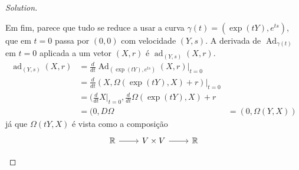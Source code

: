 \begin{proof}[Solution]
\begin{enumerate}[label=\alph*.]
Em fim, parece que tudo se reduce a usar a curva $\gamma(t)=(\operatorname{exp}(tY),e^{ts})$, que em $t=0$ passa por $(0,0)$ com velocidade $(Y,s)$. A derivada de $\operatorname{Ad}_{\gamma(t)}$ em $t=0$ aplicada a um vetor $(X,r)$  é $\operatorname{ad}_{(Y,s)}(X,r)$.
\begin{align*}
	\operatorname{ad}_{(Y,s)}(X,r)&=\frac{d}{dt}\operatorname{Ad}_{(\operatorname{exp}(tY),e^{ts})}(X,r)\Big|_{t=0}\\
	&=\frac{d}{dt}(X,\Omega(\operatorname{exp}(tY),X)+r)\Big|_{t=0}\\
	&=(\frac{d}{dt}X\Big|_{t=0},\frac{d}{dt}\Omega(\operatorname{exp}(tY),X)+r\\
	&=(0,D\Omega
	&=(0,\Omega(Y,X))
\end{align*}
já que $\Omega(tY,X)$ é vista como a composição
\[\begin{tikzcd}
	\mathbb{R}\arrow[r]& V\times V\arrow[r]&\mathbb{R}
\end{tikzcd}\]

\end{enumerate}
\end{proof}

